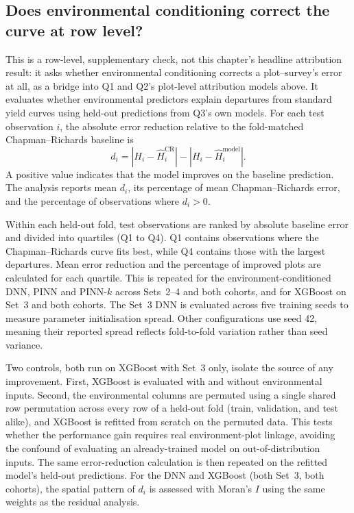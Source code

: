 \subsection*{Does environmental conditioning correct the curve at row level?}
\label{sec:rq2a-method}
This is a row-level, supplementary check, not this chapter's headline attribution result: it asks whether environmental conditioning corrects a plot--survey's error at all, as a bridge into Q1 and Q2's plot-level attribution models above. It evaluates whether environmental predictors explain departures from standard yield curves using held-out predictions from Q3's own models. For each test observation $i$, the absolute error reduction relative to the fold-matched Chapman--Richards baseline is
\begin{equation}
d_i=\left|H_i-\hat H_i^{\mathrm{CR}}\right|-
\left|H_i-\hat H_i^{\mathrm{model}}\right|.
\label{eq:residual-reduction}
\end{equation}
A positive value indicates that the model improves on the baseline prediction. The analysis reports mean $d_i$, its percentage of mean Chapman--Richards error, and the percentage of observations where $d_i>0$.

Within each held-out fold, test observations are ranked by absolute baseline error and divided into quartiles (Q1 to Q4). Q1 contains observations where the Chapman--Richards curve fits best, while Q4 contains those with the largest departures. Mean error reduction and the percentage of improved plots are calculated for each quartile. This is repeated for the environment-conditioned DNN, PINN and PINN-$k$ across Sets~2--4 and both cohorts, and for XGBoost on Set~3 and both cohorts. The Set~3 DNN is evaluated across five training seeds to measure parameter initialisation spread. Other configurations use seed 42, meaning their reported spread reflects fold-to-fold variation rather than seed variance.

Two controls, both run on XGBoost with Set~3 only, isolate the source of any improvement. First, XGBoost is evaluated with and without environmental inputs. Second, the environmental columns are permuted using a single shared row permutation across every row of a held-out fold (train, validation, and test alike), and XGBoost is refitted from scratch on the permuted data. This tests whether the performance gain requires real environment-plot linkage, avoiding the confound of evaluating an already-trained model on out-of-distribution inputs. The same error-reduction calculation is then repeated on the refitted model's held-out predictions. For the DNN and XGBoost (both Set~3, both cohorts), the spatial pattern of $d_i$ is assessed with Moran's $I$ using the same weights as the residual analysis.

